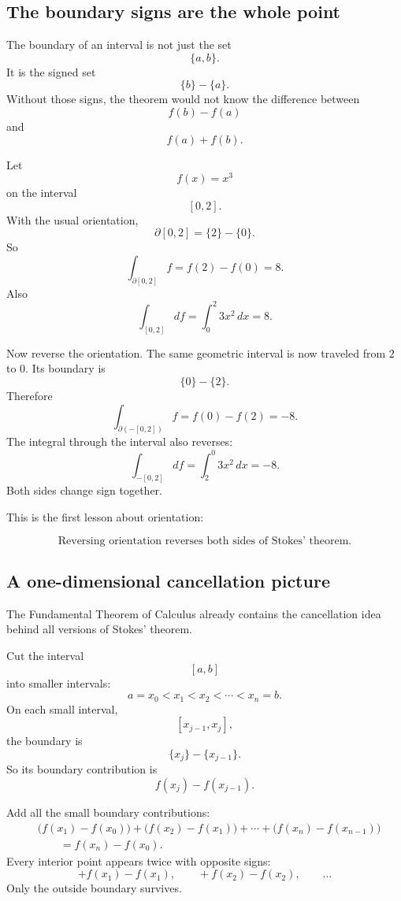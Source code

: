 \subsection{The boundary signs are the whole point}

The boundary of an interval is not just the set
\[
    \{a,b\}.
\]
It is the signed set
\[
    \{b\}-\{a\}.
\]
Without those signs, the theorem would not know the difference between
\[
    f(b)-f(a)
\]
and
\[
    f(a)+f(b).
\]

\begin{example}
Let
\[
    f(x)=x^3
\]
on the interval
\[
    [0,2].
\]
With the usual orientation,
\[
    \partial[0,2]=\{2\}-\{0\}.
\]
So
\[
    \int_{\partial[0,2]}f=f(2)-f(0)=8.
\]
Also
\[
    \int_{[0,2]}df=\int_0^2 3x^2\,dx=8.
\]

Now reverse the orientation.  The same geometric interval is now traveled from \(2\)
to \(0\).  Its boundary is
\[
    \{0\}-\{2\}.
\]
Therefore
\[
    \int_{\partial(-[0,2])}f=f(0)-f(2)=-8.
\]
The integral through the interval also reverses:
\[
    \int_{-[0,2]}df=\int_2^0 3x^2\,dx=-8.
\]
Both sides change sign together.
\end{example}

This is the first lesson about orientation:

\[
\boxed{
    \text{Reversing orientation reverses both sides of Stokes' theorem.}
}
\]

\subsection{A one-dimensional cancellation picture}

The Fundamental Theorem of Calculus already contains the cancellation idea behind all
versions of Stokes' theorem.

Cut the interval
\[
    [a,b]
\]
into smaller intervals:
\[
    a=x_0<x_1<x_2<\cdots<x_n=b.
\]
On each small interval,
\[
    [x_{j-1},x_j],
\]
the boundary is
\[
    \{x_j\}-\{x_{j-1}\}.
\]
So its boundary contribution is
\[
    f(x_j)-f(x_{j-1}).
\]

Add all the small boundary contributions:
\[
\begin{aligned}
&\bigl(f(x_1)-f(x_0)\bigr)
+\bigl(f(x_2)-f(x_1)\bigr)
+\cdots
+\bigl(f(x_n)-f(x_{n-1})\bigr)\\
&\qquad =
f(x_n)-f(x_0).
\end{aligned}
\]
Every interior point appears twice with opposite signs:
\[
    +f(x_1)-f(x_1),
    \qquad
    +f(x_2)-f(x_2),
    \qquad
    \ldots
\]
Only the outside boundary survives.

